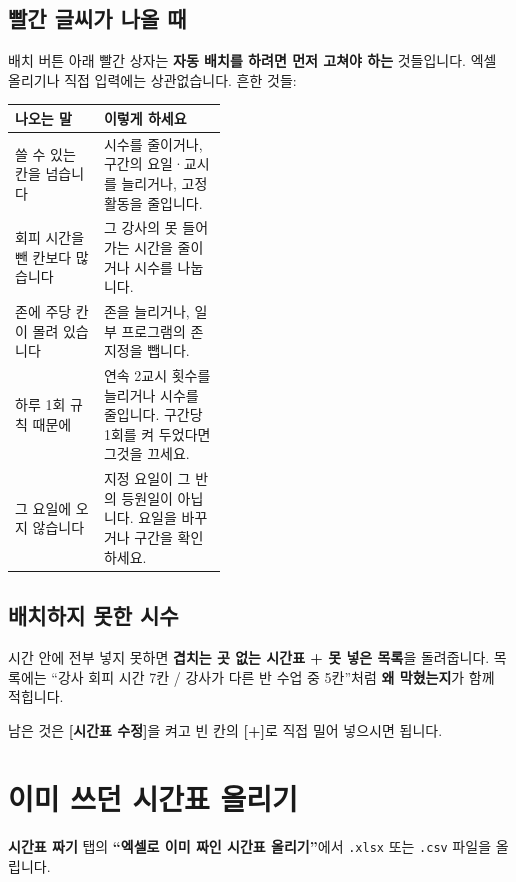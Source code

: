 \documentclass[11pt,a4paper]{article}
\newcommand{\btn}[1]{\textcolor{ttdark}{\sffamily\bfseries[#1]}}   %
\newcommand{\tab}[1]{\textcolor{ttblue}{\sffamily\bfseries#1}}      %
\newcommand{\field}[1]{\textsf{#1}}                                 %
\newcommand{\code}[1]{\texttt{\small #1}}
\newcommand{\hd}[1]{\textcolor{ttdark}{\sffamily\bfseries #1}}
\begin{document}
\subsection{빨간 글씨가 나올 때}

배치 버튼 아래 빨간 상자는 \textbf{자동 배치를 하려면 먼저 고쳐야 하는} 것들입니다.
엑셀 올리기나 직접 입력에는 상관없습니다. 흔한 것들:

\begin{center}
\begin{tabularx}{\linewidth}{@{}>{\raggedright\arraybackslash}p{0.42\linewidth} X@{}}
\toprule
\hd{나오는 말} & \hd{이렇게 하세요} \\
\midrule
쓸 수 있는 칸을 넘습니다 & 시수를 줄이거나, 구간의 요일·교시를 늘리거나, 고정 활동을 줄입니다. \\
회피 시간을 뺀 칸보다 많습니다 & 그 강사의 못 들어가는 시간을 줄이거나 시수를 나눕니다. \\
존에 주당 칸이 몰려 있습니다 & 존을 늘리거나, 일부 프로그램의 존 지정을 뺍니다. \\
하루 1회 규칙 때문에 & 연속 2교시 횟수를 늘리거나 시수를 줄입니다.
\field{구간당 1회}를 켜 두었다면 그것을 끄세요. \\
그 요일에 오지 않습니다 & \field{지정 요일}이 그 반의 등원일이 아닙니다. 요일을 바꾸거나 구간을 확인하세요. \\
\bottomrule
\end{tabularx}
\end{center}

\subsection{배치하지 못한 시수}

시간 안에 전부 넣지 못하면 \textbf{겹치는 곳 없는 시간표 + 못 넣은 목록}을 돌려줍니다.
목록에는 ``강사 회피 시간 7칸 / 강사가 다른 반 수업 중 5칸''처럼 \textbf{왜 막혔는지}가 함께 적힙니다.

남은 것은 \btn{시간표 수정}을 켜고 빈 칸의 \btn{+}로 직접 밀어 넣으시면 됩니다.

\section{이미 쓰던 시간표 올리기}\label{sec:upload}

\tab{시간표 짜기} 탭의 \textbf{``엑셀로 이미 짜인 시간표 올리기''}에서 \code{.xlsx} 또는 \code{.csv} 파일을 올립니다.
\end{document}
